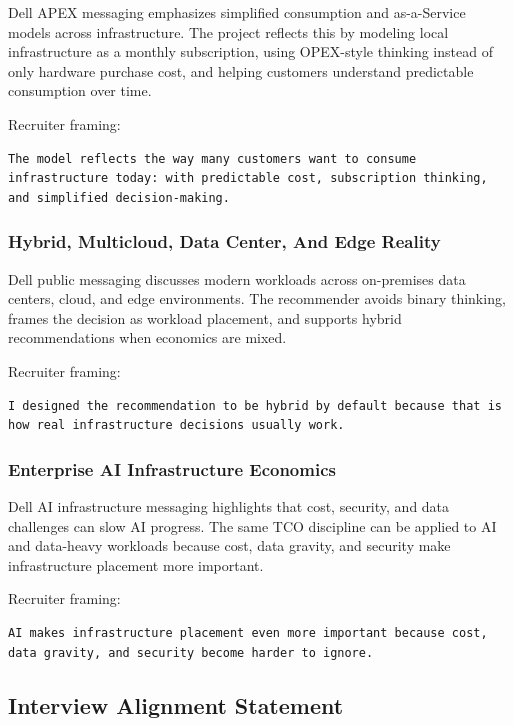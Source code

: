 \documentclass[11pt,a4paper]{article}
\begin{document}
Dell APEX messaging emphasizes simplified consumption and as-a-Service models across infrastructure. The project reflects this by modeling local infrastructure as a monthly subscription, using OPEX-style thinking instead of only hardware purchase cost, and helping customers understand predictable consumption over time.

Recruiter framing:

\begin{lstlisting}
The model reflects the way many customers want to consume infrastructure today: with predictable cost, subscription thinking, and simplified decision-making.
\end{lstlisting}

\subsubsection{Hybrid, Multicloud, Data Center, And Edge Reality}

Dell public messaging discusses modern workloads across on-premises data centers, cloud, and edge environments. The recommender avoids binary thinking, frames the decision as workload placement, and supports hybrid recommendations when economics are mixed.

Recruiter framing:

\begin{lstlisting}
I designed the recommendation to be hybrid by default because that is how real infrastructure decisions usually work.
\end{lstlisting}

\subsubsection{Enterprise AI Infrastructure Economics}

Dell AI infrastructure messaging highlights that cost, security, and data challenges can slow AI progress. The same TCO discipline can be applied to AI and data-heavy workloads because cost, data gravity, and security make infrastructure placement more important.

Recruiter framing:

\begin{lstlisting}
AI makes infrastructure placement even more important because cost, data gravity, and security become harder to ignore.
\end{lstlisting}

\subsection{Interview Alignment Statement}
\end{document}
